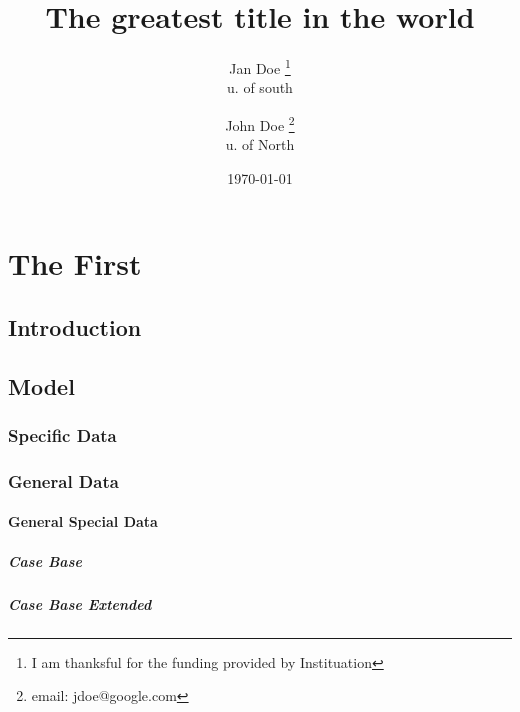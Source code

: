 \documentclass[12pt, twoside]{book}
\title{The greatest title in the world}
\author{Jan Doe \thanks{I am thanksful for the funding provided by Instituation}\\u. of south \and John Doe \thanks{email: jdoe@google.com}\\u. of North}
\date{\today}
\begin{document}
\maketitle
\tableofcontents

\chapter{The First}

\section{Introduction}
    \lipsum[2]

\setcounter{section}{7}    
\section{Model}
    \lipsum[3]
\subsection{Specific Data} 
    \lipsum[4]
\subsection{General Data}    
    \lipsum[5]
\subsubsection{General Special Data}    
    \lipsum[6]
\paragraph{Case Base}    
\lipsum[7]
\paragraph{Case Base Extended}    
\lipsum[8]

\end{document}
